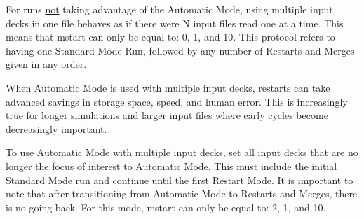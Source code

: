 For runs \underline{not} taking advantage of the Automatic Mode, using multiple input decks in one file behaves as if there were N input files read one at a time.  This means that mstart can only be equal to: 0, 1, and 10.  This protocol refers to having one Standard Mode Run, followed by any number of Restarts and Merges given in any order.

When Automatic Mode is used with multiple input decks, restarts can take advanced savings in storage space, speed, and human error.  This is increasingly true for longer simulations and larger input files where early cycles become decreasingly important. 

To use Automatic Mode with multiple input decks, set all input decks that are no longer the focus of interest to Automatic Mode.  This must include the initial Standard Mode run and continue until the first Restart Mode.  It is important to note that after transitioning from Automatic Mode to Restarts and Merges, there is no going back.  For this mode, mstart can only be equal to: 2, 1, and 10.